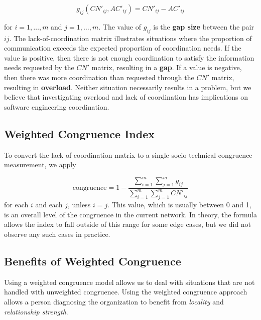 \documentclass[12pt,oneside]{book}
\begin{document}
 \[ g_{ij}(CN'_{ij}, AC'_{ij}) = CN'_{ij} - AC'_{ij} \]

\noindent for $i=1,\dots,m$ and $j=1,\dots,m$. The value of $g_{ij}$ is the \textbf{gap size} between the pair $ij$. The lack-of-coordination matrix illustrates situations where the proportion of communication exceeds the expected proportion of coordination needs. If the value is positive, then there is not enough coordination to satisfy the information needs requested by the $CN'$ matrix, resulting in a \textbf{gap}. If a value is negative, then there was more coordination than requested through the $CN'$ matrix, resulting in \textbf{overload}.  Neither situation necessarily results in a problem, but we believe that investigating overload and lack of coordination has implications on software engineering coordination.


\subsection{Weighted Congruence Index}


To convert the lack-of-coordination matrix to a single socio-technical congruence measurement, we apply

\[ \text{congruence} = 1 - \frac{\displaystyle\sum^{m}_{i=1} \sum^{m}_{j=1} g_{ij}}{\displaystyle\sum^{m}_{i=1}\sum^{m}_{j=1}CN'_{ij}} \]
\noindent for each $i$ and each $j$, unless $i=j$. This value, which is usually between 0 and 1, is an overall level of the congruence in the current network. In theory, the formula allows the index to fall outside of this range for some edge cases, but we did not observe any such cases in practice.


\subsection{Benefits of Weighted Congruence}
\label{sec:benefit}

Using a weighted congruence model allows us to deal with situations that are not handled with unweighted congruence.
Using the weighted congruence approach allows a person diagnosing the organization to benefit from \emph{locality} and \emph{relationship strength}.
\end{document}
